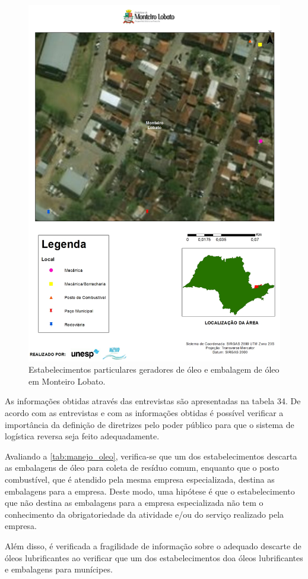 \begin{description}
	\begin{figure}
		\centering
		\includegraphics[width=0.75\linewidth]{produtos/prodtres/image093}
		\caption{Estabelecimentos particulares geradores de óleo e embalagem de óleo em Monteiro Lobato.}
		\label{fig:image093}
	\end{figure}
	
	
	As informações obtidas através das entrevistas são apresentadas na tabela 34. De acordo com as entrevistas e com as informações obtidas é possível verificar a importância da definição de diretrizes pelo poder público para que o sistema de logística reversa seja feito adequadamente.
	
	Avaliando a \autoref{tab:manejo_oleo}, verifica-se que um dos estabelecimentos descarta as embalagens de óleo para coleta de resíduo comum, enquanto que o posto combustível, que é atendido pela mesma empresa especializada, destina as embalagens para a empresa. Deste modo, uma hipótese é que o estabelecimento que não destina as embalagens para a empresa especializada não tem o conhecimento da obrigatoriedade da atividade e/ou do serviço realizado pela empresa.
	
	Além disso, é verificada a fragilidade de informação sobre o adequado descarte de óleos lubrificantes ao verificar que um dos estabelecimentos doa óleos lubrificantes e embalagens para munícipes.
	

\end{description}
